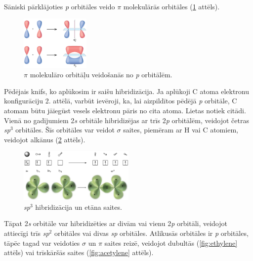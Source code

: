 \documentclass[12pt,a4paper]{article}
\newcommand{\figref}[1]{\ref{#1} attēls}
\begin{document}
Sāniski pārklājoties \textit{p} orbitāles veido $\pi$ molekulārās orbitāles (\figref{fig:p_pi}).

\begin{figure}[H]
    \centering
    \includegraphics[width=0.3\textwidth]{atteli/p_pi.jpg}
    \caption{$\pi$ molekulāro orbitāļu veidošanās no \textit{p} orbitālēm.}
    \label{fig:p_pi}
\end{figure}

Pēdējais knifs, ko aplūkosim ir saišu hibridizācija. Ja aplūkoji C atoma elektronu konfigurāciju 2. attēlā, varbūt ievēroji, ka, lai aizpildītos pēdējā \textit{p} orbitāle, C atomam būtu jāiegūst vesels elektronu pāris no cita atoma. Lietas notiek citādi. Vienā no gadījumiem 2\textit{s} orbitāle hibridizējas ar trīs 2\textit{p} orbitālēm, veidojot četras \textit{sp}$^3$ orbitāles. Šīs orbitāles var veidot $\sigma$ saites, piemēram ar H vai C atomiem, veidojot alkānus (\figref{fig:ethane}).

\begin{figure}[H]
    \centering
    \includegraphics[width=0.5\textwidth]{atteli/ethane.png}
    \caption{\textit{sp}$^3$ hibridizācija un etāna saites.}
    \label{fig:ethane}
\end{figure}

Tāpat 2\textit{s} orbitāle var hibridizēties ar divām vai vienu 2\textit{p} orbitāli, veidojot attiecīgi trīs \textit{sp}$^2$ orbitāles vai divas \textit{sp} orbitāles. Atlikusās orbitāles ir \textit{p} orbitāles, tāpēc tagad var veidoties $\sigma$ un $\pi$ saites reizē, veidojot dubultās (\figref{fig:ethylene}) vai trīskāršās saites (\figref{fig:acetylene}).
\end{document}
